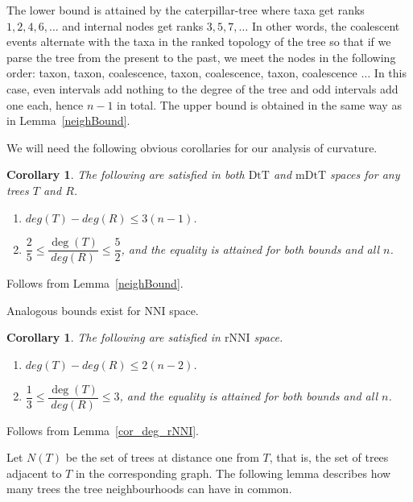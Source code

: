 \documentclass{amsart}
\newtheorem{corollary}[lemma]{Corollary}
\newcommand{\dts}{\mathrm{DtT}}
\newcommand{\nni}{\mathrm{NNI}}
\newcommand{\rnni}{\mathrm{rNNI}}
\newcommand{\mdts}{\mathrm{mDtT}}
\begin{document}
\proof
The lower bound is attained by the caterpillar-tree where taxa get ranks $1, 2, 4, 6, \ldots$ and internal nodes get ranks $3, 5, 7, \ldots$
In other words, the coalescent events alternate with the taxa in the ranked topology of the tree so that if we parse the tree from the present to the past, we meet the nodes in the following order: taxon, taxon, coalescence, taxon, coalescence, taxon, coalescence $\ldots$
In this case, even intervals add nothing to the degree of the tree and odd intervals add one each, hence $n-1$ in total.
The upper bound is obtained in the same way as in Lemma~\ref{neighBound}.
\endproof

We will need the following obvious corollaries for our analysis of curvature.

\begin{corollary}\label{degreeBounds}
The following are satisfied in both $\dts$ and $\mdts$ spaces for any trees $T$ and $R$.
\begin{enumerate}[(1)]
\item $deg(T)-deg(R) \leq 3(n-1)$.
\item $\dfrac25 \leq \dfrac{\deg(T)}{deg(R)} \leq \dfrac52$, and the equality is attained for both bounds and all $n$.
\end{enumerate}
\end{corollary}

\proof
Follows from Lemma~\ref{neighBound}.
\endproof

Analogous bounds exist for $\nni$ space.

\begin{corollary}\label{degreeBoundsNNI}
The following are satisfied in $\rnni$ space.
\begin{enumerate}[(1)]
\item $deg(T)-deg(R) \leq 2(n-2)$.
\item $\dfrac13 \leq \dfrac{\deg(T)}{deg(R)} \leq 3$, and the equality is attained for both bounds and all $n$.
\end{enumerate}
\end{corollary}

\proof
Follows from Lemma~\ref{cor_deg_rNNI}.
\endproof

Let $N(T)$ be the set of trees at distance one from $T$, that is, the set of trees adjacent to $T$ in the corresponding graph.
The following lemma describes how many trees the tree neighbourhoods can have in common.
\end{document}
